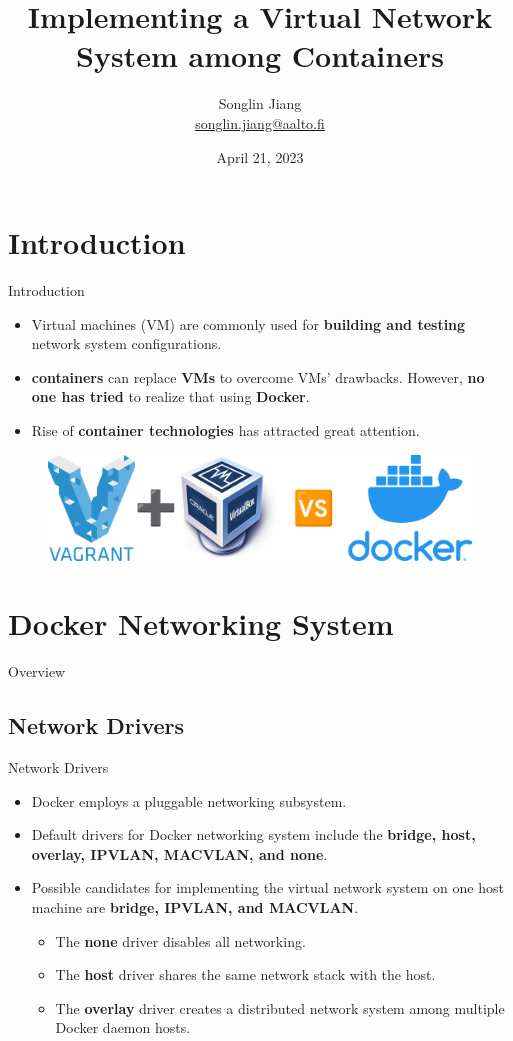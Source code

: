 \documentclass{beamer}
\title{Implementing a Virtual Network\\ System among Containers}
\author{\texorpdfstring{Songlin Jiang\\ \url{songlin.jiang@aalto.fi}}{Songlin Jiang}}
\institute{Tutor: Tuomas Aura}
\date{April 21, 2023}
\begin{document}
\frame{\titlepage}

\section*{Introduction}
\begin{frame}{Introduction}
\begin{itemize}
\item Virtual machines (VM) are commonly used for \textbf{building and testing} network system configurations.
\item  \textbf{containers} can replace \textbf{VMs} to overcome VMs' drawbacks. However, \textbf{no one has tried} to realize that using \textbf{Docker}.
\item Rise of \textbf{container technologies} has attracted great attention.
\end{itemize}
\begin{figure}[t!]
  \begin{center}
    \includegraphics[scale=0.7]{slide/img/vs.png}
    \label{fig:demo}
  \end{center}
\end{figure}
\end{frame}

\section{Docker Networking System}
\begin{frame}{Overview}
    \tableofcontents[currentsection]
\end{frame}
\subsection{Network Drivers}
\begin{frame}{Network Drivers}
\begin{itemize}
\item Docker employs a pluggable networking subsystem.
\item Default drivers for Docker networking system include the \textbf{bridge, host, overlay, IPVLAN, MACVLAN, and none}.
\item Possible candidates for implementing the virtual network system on one host machine are \textbf{bridge, IPVLAN, and MACVLAN}.
\begin{itemize}
    \item The \textbf{none} driver disables all networking.
    \item The \textbf{host} driver shares the same network stack with the host.
    \item The \textbf{overlay} driver creates a distributed network system among multiple Docker daemon hosts.
\end{itemize}
\end{itemize}
\end{frame}
\end{document}
